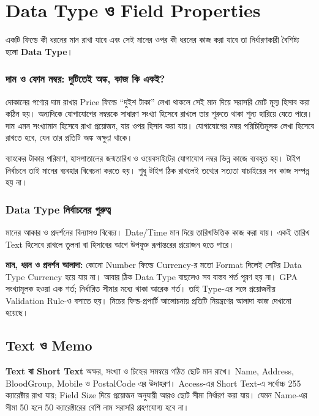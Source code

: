\section{Data Type ও Field Properties}

\begin{definitionbox}{}
একটি ফিল্ডে কী ধরনের মান রাখা যাবে এবং সেই মানের ওপর কী ধরনের কাজ করা যাবে তা নির্ধারণকারী বৈশিষ্ট্য হলো \textbf{Data Type}।
\end{definitionbox}


\subsubsection{দাম ও ফোন নম্বর: দুটিতেই অঙ্ক, কাজ কি একই?}
দোকানের পণ্যের দাম রাখার Price ফিল্ডে ``দুইশ টাকা'' লেখা থাকলে সেই মান দিয়ে সরাসরি মোট মূল্য হিসাব করা কঠিন হয়।
অন্যদিকে যোগাযোগের নম্বরকে সাধারণ সংখ্যা হিসেবে রাখলে তার শুরুতে থাকা শূন্য হারিয়ে যেতে পারে। দাম এমন
সংখ্যামান হিসেবে রাখা প্রয়োজন, যার ওপর হিসাব করা যায়। যোগাযোগের নম্বর পরিচিতিমূলক লেখা হিসেবে রাখতে হবে,
যেন তার প্রতিটি অঙ্ক অক্ষুণ্ণ থাকে।

ব্যাংকের টাকার পরিমাণ, হাসপাতালের জন্মতারিখ ও ওয়েবসাইটের যোগাযোগ নম্বর ভিন্ন কাজে ব্যবহৃত হয়। টাইপ নির্বাচনে তাই মানের ব্যবহার বিবেচনা করতে হয়। শুধু টাইপ ঠিক রাখলেই তথ্যের সত্যতা যাচাইয়ের সব কাজ সম্পন্ন হয় না।




\subsubsection{Data Type নির্বাচনের গুরুত্ব}
মানের আকার ও প্রদর্শনের বিন্যাসও বিবেচ্য। Date/Time মান দিয়ে তারিখভিত্তিক কাজ করা যায়। একই তারিখ Text হিসেবে রাখলে তুলনা বা হিসাবের আগে উপযুক্ত রূপান্তরের প্রয়োজন হতে পারে।

\textbf{মান, ধরন ও প্রদর্শন আলাদা:} কোনো Number ফিল্ডে Currency-র মতো Format দিলেই সেটির Data Type Currency হয়ে যায় না। আবার ঠিক Data Type বাছলেও সব বাস্তব শর্ত পূরণ হয় না। GPA সংখ্যামূলক হওয়া এক শর্ত; নির্ধারিত সীমার মধ্যে থাকা আরেক শর্ত। তাই Type-এর সঙ্গে প্রয়োজনীয় Validation Rule-ও বসাতে হয়। নিচের ফিল্ড-প্রপার্টি আলোচনায় প্রতিটি নিয়ন্ত্রণের আলাদা কাজ দেখানো হয়েছে।


\subsection{Text ও Memo}
\textbf{Text বা Short Text} অক্ষর, সংখ্যা ও চিহ্নের সমন্বয়ে গঠিত ছোট মান রাখে। Name, Address, BloodGroup, Mobile ও PostalCode এর উদাহরণ। Access-এর Short Text-এ সর্বোচ্চ 255 ক্যারেক্টার রাখা যায়; Field Size দিয়ে প্রয়োজন অনুযায়ী আরও ছোট সীমা নির্ধারণ করা যায়। যেমন Name-এর সীমা 50 হলে 50 ক্যারেক্টারের বেশি নাম সরাসরি গ্রহণযোগ্য হবে না।


